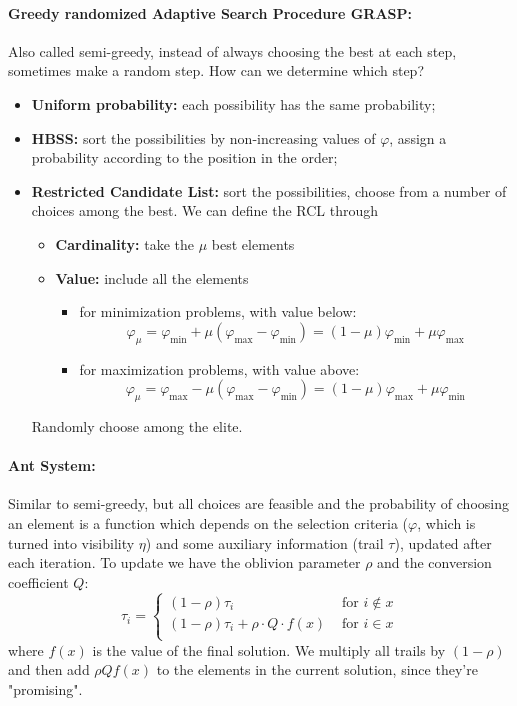 \documentclass{article}
\begin{document}
	\paragraph{Greedy randomized Adaptive Search Procedure GRASP:} Also called semi-greedy, instead of always choosing the best at each step, sometimes make a random step. How can we determine which step? 
	\begin{itemize}
		\item \textbf{Uniform probability:} each possibility has the same probability;
		\item \textbf{HBSS:} sort the possibilities by non-increasing values of $\varphi$, assign a probability according to the position in the order;
		\item \textbf{Restricted Candidate List:} sort the possibilities, choose from a number of choices among the best. We can define the RCL through 
		\begin{itemize}
			\item \textbf{Cardinality:} take the $\mu$ best elements
			\item \textbf{Value:} include all the elements 
			\begin{itemize}
				\item for minimization problems, with value below:
				$$ \varphi_\mu = \varphi_{\min} + \mu(\varphi_{\max} - \varphi_{\min}) = (1 - \mu) \varphi_{\min} + \mu \varphi_{\max} $$
				\item for maximization problems, with value above:
				$$ \varphi_\mu = \varphi_{\max} - \mu (\varphi_{\max} - \varphi_{\min}) = (1 - \mu) \varphi_{\max} + \mu \varphi_{\min} $$
			\end{itemize}
		\end{itemize}
		Randomly choose among the elite.\\
	\end{itemize}
	
	\paragraph{Ant System:} Similar to semi-greedy, but all choices are feasible and the probability of choosing an element is a function which depends on the selection criteria ($\varphi$, which is turned into visibility $\eta$) and some auxiliary information (trail $\tau$), updated after each iteration. To update we have the oblivion parameter $\rho$ and the conversion coefficient $Q$: 
	$$ 
	\tau_i = \begin{cases}
		(1 - \rho) \tau_i & \text{ for } i \notin x \\
		(1 - \rho) \tau_i + \rho \cdot Q \cdot f(x) & \text{ for } i \in x \\
	\end{cases}
	$$
	where $f(x)$ is the value of the final solution. We multiply all trails by $(1-\rho)$ and then add $\rho Q f(x)$ to the elements in the current solution, since they're "promising".\\
	
\end{document}
